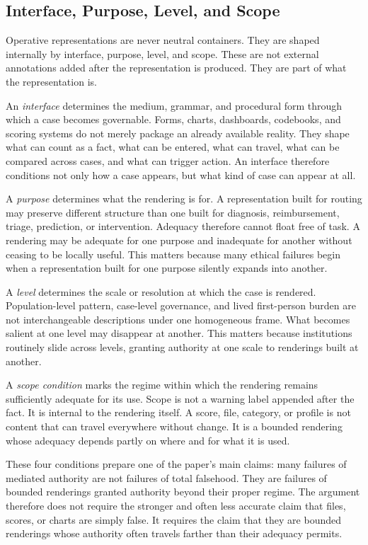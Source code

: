 \documentclass[11pt]{article}
\renewcommand{\emph}[1]{\textit{#1}}
\begin{document}
\subsection{Interface, Purpose, Level, and Scope}

Operative representations are never neutral containers. They are shaped internally by interface, purpose, level, and scope. These are not external annotations added after the representation is produced. They are part of what the representation is. \cite{Swanson2026ConstrainedDescribability,Swanson2026ConstraintConditionDisclosure,BowkerStar1999SortingThingsOut}

An \emph{interface} determines the medium, grammar, and procedural form through which a case becomes governable. Forms, charts, dashboards, codebooks, and scoring systems do not merely package an already available reality. They shape what can count as a fact, what can be entered, what can travel, what can be compared across cases, and what can trigger action. An interface therefore conditions not only how a case appears, but what kind of case can appear at all.

A \emph{purpose} determines what the rendering is for. A representation built for routing may preserve different structure than one built for diagnosis, reimbursement, triage, prediction, or intervention. Adequacy therefore cannot float free of task. A rendering may be adequate for one purpose and inadequate for another without ceasing to be locally useful. This matters because many ethical failures begin when a representation built for one purpose silently expands into another.

A \emph{level} determines the scale or resolution at which the case is rendered. Population-level pattern, case-level governance, and lived first-person burden are not interchangeable descriptions under one homogeneous frame. What becomes salient at one level may disappear at another. This matters because institutions routinely slide across levels, granting authority at one scale to renderings built at another.

A \emph{scope condition} marks the regime within which the rendering remains sufficiently adequate for its use. Scope is not a warning label appended after the fact. It is internal to the rendering itself. A score, file, category, or profile is not content that can travel everywhere without change. It is a bounded rendering whose adequacy depends partly on where and for what it is used.

These four conditions prepare one of the paper's main claims: many failures of mediated authority are not failures of total falsehood. They are failures of bounded renderings granted authority beyond their proper regime. The argument therefore does not require the stronger and often less accurate claim that files, scores, or charts are simply false. It requires the claim that they are bounded renderings whose authority often travels farther than their adequacy permits.
\end{document}
